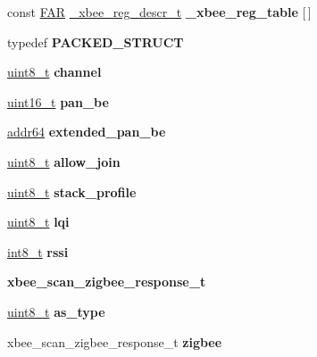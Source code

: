 \begin{DoxyCompactItemize}
\mbox{\label{group__xbee__atcmd_ga38e53826af221faaa9c92525dfeb8ed3}} 
const \hyperlink{group__hal_gaef060b3456fdcc093a7210a762d5f2ed}{F\+AR} \hyperlink{struct__xbee__reg__descr__t}{\+\_\+xbee\+\_\+reg\+\_\+descr\+\_\+t} {\bfseries \+\_\+xbee\+\_\+reg\+\_\+table} \mbox{[}$\,$\mbox{]}
\item 
typedef {\bfseries P\+A\+C\+K\+E\+D\+\_\+\+S\+T\+R\+U\+CT}
\item 
\mbox{\label{group__xbee__atcmd_ga715f5cb061d11eb75981741eda4dafcd}} 
\hyperlink{group__hal__dos_gae1affc9ca37cfb624959c866a73f83c2}{uint8\+\_\+t} {\bfseries channel}
\item 
\mbox{\label{group__xbee__atcmd_ga6764c432df57e31f99d528ba063ee3c3}} 
\hyperlink{group__hal__dos_ga5a8b2dc9e45a9ee81a94ef304fb62505}{uint16\+\_\+t} {\bfseries pan\+\_\+be}
\item 
\mbox{\label{group__xbee__atcmd_ga83454e414bc47cecde95577336ef19d5}} 
\hyperlink{unionaddr64}{addr64} {\bfseries extended\+\_\+pan\+\_\+be}
\item 
\mbox{\label{group__xbee__atcmd_ga4c103634447787a8b0d3377ea51107e9}} 
\hyperlink{group__hal__dos_gae1affc9ca37cfb624959c866a73f83c2}{uint8\+\_\+t} {\bfseries allow\+\_\+join}
\item 
\mbox{\label{group__xbee__atcmd_gaaa8b6f584719cbc7ae8923ced6e88766}} 
\hyperlink{group__hal__dos_gae1affc9ca37cfb624959c866a73f83c2}{uint8\+\_\+t} {\bfseries stack\+\_\+profile}
\item 
\mbox{\label{group__xbee__atcmd_ga0dd69605aea6dba42ffd851067dbfe77}} 
\hyperlink{group__hal__dos_gae1affc9ca37cfb624959c866a73f83c2}{uint8\+\_\+t} {\bfseries lqi}
\item 
\mbox{\label{group__xbee__atcmd_ga3b962e67ba74725bd60ca3c29f785abe}} 
\hyperlink{group__hal__dos_ga20c38cc5aac7cc6b0a3c6ab05428436d}{int8\+\_\+t} {\bfseries rssi}
\item 
\mbox{\label{group__xbee__atcmd_gabf6256ab8381b527e6933fa07b03b378}} 
{\bfseries xbee\+\_\+scan\+\_\+zigbee\+\_\+response\+\_\+t}
\item 
\mbox{\label{group__xbee__atcmd_gaadc767576eaf9c39b663366c0b05c88c}} 
\hyperlink{group__hal__dos_gae1affc9ca37cfb624959c866a73f83c2}{uint8\+\_\+t} {\bfseries as\+\_\+type}
\item 
\mbox{\label{group__xbee__atcmd_ga487bfb4c432a318974154d1ebd0330ae}} 
xbee\+\_\+scan\+\_\+zigbee\+\_\+response\+\_\+t {\bfseries zigbee}
\end{DoxyCompactItemize}
